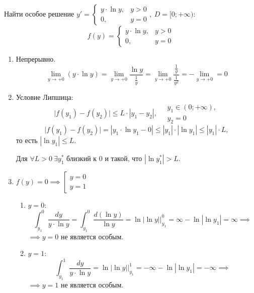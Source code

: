 \begin{example}
    Найти особое решение $y' = \left\{\begin{array}{rl}
            y\cdot\ln y, & y > 0 \\
            0,           & y = 0
        \end{array}\right., \ D = [0;+\infty)$:
    \[
        f(y) = \left\{\begin{array}{rl}
            y\cdot\ln y, & y > 0 \\
            0,           & y = 0
        \end{array}\right.
    \]
    \begin{enumerate}
        \item Непрерывно.
              \[
                  \underset{y\rightarrow+0}{\lim}(y\cdot \ln y) = \underset{y\rightarrow+0}{\lim}\frac{\ln y}{\frac{1}{y}} = \underset{y\rightarrow+0}{\lim}\frac{\frac{1}{y}}{\frac{1}{y^2}} = -\underset{y\rightarrow+0}{\lim} = 0
              \]
        \item Условие Липшица:
              \[
                  \big|f(y_1) - f(y_2)\big| \leqslant L \cdot |y_1 - y_2|, \quad \begin{array}{l}
                      y_1 \in (0;+\infty), \\
                      y_2 = 0
                  \end{array}
              \]
              \[
                  \big|f(y_1) - f(y_2)\big| = |y_1\cdot \ln y_1 - 0| \leqslant |y_1|\cdot|\ln y_1| \leqslant |y_1| \cdot L,
              \]
              то есть $|\ln y_1| \leqslant L$.

              Для $\forall L > 0 \ \exists y_1^*$ близкий к $0$ и такой, что $|\ln y_1^*| > L$.
        \item $f(y) = 0 \implies \left[\begin{array}{l}
                      y = 0 \\
                      y = 1
                  \end{array}\right.$
              \begin{enumerate}
                  \item $y = 0$:
                        \[
                            \int_{y_1}^{0}\frac{dy}{y \cdot \ln y} = \int_{y_1}^{0}\frac{d(\ln y)}{\ln y} = \ln |\ln y| \Big|_{y_1}^0 = \infty - \ln|\ln y_1| = \infty \implies
                        \]
                        $\implies y =0$ не является особым.
                  \item $y = 1$:
                        \[
                            \int_{y_1}^{1}\frac{dy}{y\cdot \ln y} = \ln|\ln y| \Big|_{y_1}^1 = -\infty - \ln|\ln y_1| = - \infty \implies
                        \]
                        $\implies y =1$ не является особым.
              \end{enumerate}
    \end{enumerate}
\end{example}

